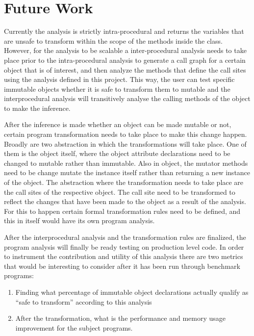 \section{Future Work}
Currently the analysis is strictly intra-procedural and returns the variables that are unsafe to transform within the scope of the methods inside the class. However, for the analysis to be scalable a inter-procedural analysis needs to take place prior to the intra-procedural analysis to generate a call graph for a certain object that is of interest, and then analyze the methods that define the call sites using the analysis defined in this project. This way, the user can test specific immutable objects whether it is safe to transform them to mutable and the interprocedural analysis will transitively analyse the calling methods of the object to make the inference.

After the inference is made whether an object can be made mutable or not, certain program transformation needs to take place to make this change happen. Broadly are two abstraction in which the transformations will take place. One of them is the object itself, where the object attribute declarations need to be changed to mutable rather than immutable. Also in object, the mutator methods need to be change mutate the instance itself rather than returning a new instance of the object. The abstraction where the transformation needs to take place are the call sites of the respective object. The call site need to be transformed to reflect the changes that have been made to the object as a result of the analysis. For this to happen certain formal transformation rules need to be defined, and this in itself would have its own program analysis.

After the interprocedural analysis and the transformation rules are finalized, the program analysis will finally be ready testing on production level code. In order to instrument the contribution and utility of this analysis there are two metrics that would be interesting to consider after it has been run through benchmark programs:
\begin{enumerate}
\item Finding what percentage of immutable object declarations actually qualify as ``safe to transform'' according to this analysis
\item After the transformation, what is the performance and memory usage improvement for the subject programs.
\end{enumerate}